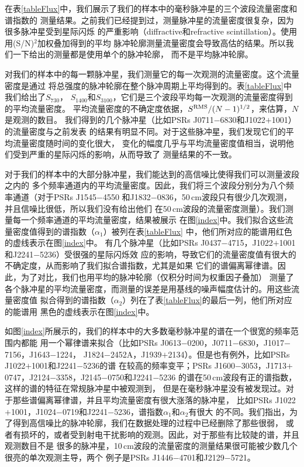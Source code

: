 在表\ref{tableFlux}中，我们展示了我们的样本中的毫秒脉冲星的三个波段流量密度和谱指数的
测量结果。之前我们已经提到过，测量脉冲星的流量密度很复杂，因为很多脉冲星受到星际闪烁
的严重影响（diffractive和refractive scintillation）。使用用(S/N)$^2$加权叠加得到的平均
脉冲轮廓测量流量密度会导致高估的结果。所以我们一下给出的测量都是使用单个的脉冲轮廓，
而不是平均脉冲轮廓。

对我们的样本中的每一颗脉冲星，我们测量它的每一次观测的流量密度。这个流量密度是通过
将总强度的脉冲轮廓在整个脉冲周期上平均得到的。表\ref{tableFlux}中我们给出了$S_{730}$，
$S_{1400}$和$S_{3100}$，它们是三个波段平均每一次观测的流量密度得到的平均流量密度。
平均流量密度的不确定度依据，$S^{\rm{RMS}}/(N-1)^{1/2}$，来估算，$N$是观测的数目。
%
我们得到的几个脉冲星（比如PSRs J0711$-$6830和J1022$+$1001）的流量密度与之前发表\supercite{Yan11a}
的结果有明显不同。对于这些脉冲星，我们发现它们的平均流量密度随时间的变化很大，
变化的幅度几乎与平均流量密度值相当，说明他们受到严重的星际闪烁的影响，从而导致了
测量结果的不一致。

对于我们的样本中的大部分脉冲星，我们能达到的高信噪比使得我们可以测量波段之内的
多个频率通道内的平均流量密度。因此，我们将三个波段分别分为八个频率通道（对于PSRs J1545$-$4550
和J1832$-$0836，50\,cm波段只有很少几次观测，并且信噪比很低，所以我们没有给出他们
在50\,cm波段的流量密度测量）。我们测量每一个频率通道的平均流量密度，结果被展示
在图\ref{index}中。我们拟合这些流量密度值得到的谱指数（$\alpha_1$）被列在表\ref{tableFlux}
中，他们所对应的能谱用红色的虚线表示在图\ref{index}中。
%
有几个脉冲星（比如PSRs J0437$-$4715，J1022$+$1001和J2241$-$5236）受很强的星际闪烁效
应的影响，导致它们的流量密度值有很大的不确定度，从而影响了我们拟合谱指数，尤其是如果
它们的谱偏离幂律谱。因此，为了对比，我们也用平均的脉冲轮廓（仅积分时间为权重因子叠加）
测量了各个脉冲星的平均流量密度，而测量的误差是用基线的噪声幅度估计的。用这些流量密度值
拟合得到的谱指数（$\alpha_2$）列在了表\ref{tableFlux}的最后一列，他们所对应的能谱用
黑色的虚线表示在图\ref{index}中。

如图\ref{index}所展示的，我们的样本中的大多数毫秒脉冲星的谱在一个很宽的频率范围内都能
用一个幂律谱来拟合（比如PSRs J0613$-$0200，J0711$-$6830，J1017$-$7156，J1643$-$1224，
J1824$-$2452A，J1939$+$2134）。但是也有例外，比如PSRs J1022$+$1001和J2241$-$5236的谱
在较高的频率变平；PSRs J1600$-$3053，J1713$+$0747，J2124$-$3358，J2145$-$0750和J2241$-$5236
的谱在50\,cm波段有正的谱指数，这样的谱的特征在常规脉冲星中被观测到\supercite{Kijak11}，
但是在毫秒脉冲星没有被发现过。对于那些谱偏离幂律谱，并且平均流量密度有很大涨落的脉冲星，
比如PSRs J1022$+$1001，J1024$-$0719和J2241$-$5236，谱指数$\alpha_1$和$\alpha_2$有很大
的不同。我们指出，为了得到高信噪比的脉冲轮廓，我们在数据处理的过程中已经删除了那些很弱，
或者有损坏的，或者受到射电干扰影响的观测。因此，对于那些有比较陡的谱，并且观测数目不是
很多的脉冲星，10\,cm波段的流量密度的测量结果很可能被少数几个很亮的单次观测主导，两个
例子是PSRs J1446$-$4701和J2129$-$5721。

